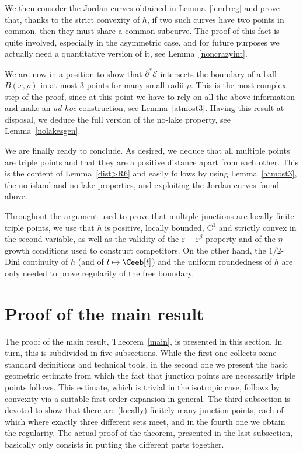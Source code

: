 We then consider the Jordan curves obtained in Lemma~\ref{lem1reg} and prove that, thanks to the strict convexity of $h$, if two such curves have two points in common, then they must share a common subcurve. The proof of this fact is quite involved, especially in the asymmetric case, and for future purposes we actually need a quantitative version of it, see Lemma~\ref{noncrazyint}.

We are now in a position to show that $\partial^*\mathcal E$ intersects the boundary of a ball $B(x,\rho)$ in at most $3$ points for many small radii $\rho$. This is the most complex step of the proof, since at this point we have to rely on all the above information and make an \emph{ad hoc} construction, see Lemma~\ref{atmost3}. Having this result at disposal, we deduce the full version of the no-lake property, see Lemma~\ref{nolakesgen}.

We are finally ready to conclude. As desired, we deduce that all multiple points are triple points and that they are a positive distance apart from each other. This is the content of Lemma~\ref{dist>R6} and easily follows by using Lemma~\ref{atmost3}, the no-island and no-lake properties, and exploiting the Jordan curves found above.

\begin{rmk}
Throughout the argument used to prove that multiple junctions are locally finite triple points, we use that $h$ is positive, locally bounded, $\mathrm{C}^1$ and strictly convex in the second variable, as well as the validity of the $\varepsilon-\varepsilon^\beta$ property and of the $\eta$-growth conditions used to construct competitors.
On the other hand, the $1/2$-Dini continuity of $h$ (and of $t\mapsto \Ceeb[t]$) and the uniform roundedness of $h$ are only needed to prove regularity of the free boundary.
\end{rmk}

\section{Proof of the main result\label{sec:proof}}

The proof of the main result, Theorem~\ref{main}, is presented in this section. In turn, this is subdivided in five subsections. While the first one collects some standard definitions and technical tools, in the second one we present the basic geometric estimate from which the fact that junction points are necessarily triple points follows. This estimate, which is trivial in the isotropic case, follows by convexity via a suitable first order expansion in general. The third subsection is devoted to show that there are (locally) finitely many junction points, each of which where exactly three different sets meet, and in the fourth one we obtain the regularity. The actual proof of the theorem, presented in the last subsection, basically only consists in putting the different parts together.

